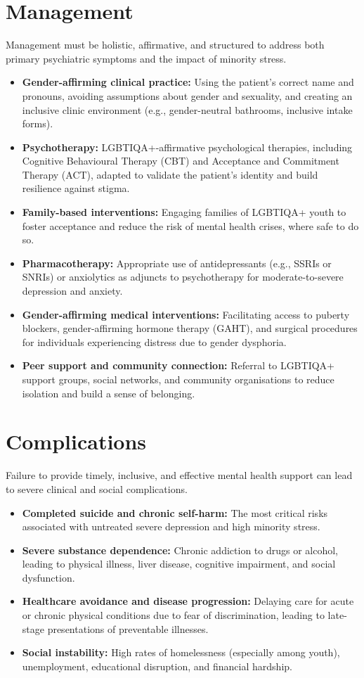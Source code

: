 \section*{Management}
Management must be holistic, affirmative, and structured to address both primary psychiatric symptoms and the impact of minority stress.
\begin{itemize}
    \item \textbf{Gender-affirming clinical practice:} Using the patient's correct name and pronouns, avoiding assumptions about gender and sexuality, and creating an inclusive clinic environment (e.g., gender-neutral bathrooms, inclusive intake forms).
    \item \textbf{Psychotherapy:} LGBTIQA+-affirmative psychological therapies, including Cognitive Behavioural Therapy (CBT) and Acceptance and Commitment Therapy (ACT), adapted to validate the patient's identity and build resilience against stigma.
    \item \textbf{Family-based interventions:} Engaging families of LGBTIQA+ youth to foster acceptance and reduce the risk of mental health crises, where safe to do so.
    \item \textbf{Pharmacotherapy:} Appropriate use of antidepressants (e.g., SSRIs or SNRIs) or anxiolytics as adjuncts to psychotherapy for moderate-to-severe depression and anxiety.
    \item \textbf{Gender-affirming medical interventions:} Facilitating access to puberty blockers, gender-affirming hormone therapy (GAHT), and surgical procedures for individuals experiencing distress due to gender dysphoria.
    \item \textbf{Peer support and community connection:} Referral to LGBTIQA+ support groups, social networks, and community organisations to reduce isolation and build a sense of belonging.
\end{itemize}

\section*{Complications}
Failure to provide timely, inclusive, and effective mental health support can lead to severe clinical and social complications.
\begin{itemize}
    \item \textbf{Completed suicide and chronic self-harm:} The most critical risks associated with untreated severe depression and high minority stress.
    \item \textbf{Severe substance dependence:} Chronic addiction to drugs or alcohol, leading to physical illness, liver disease, cognitive impairment, and social dysfunction.
    \item \textbf{Healthcare avoidance and disease progression:} Delaying care for acute or chronic physical conditions due to fear of discrimination, leading to late-stage presentations of preventable illnesses.
    \item \textbf{Social instability:} High rates of homelessness (especially among youth), unemployment, educational disruption, and financial hardship.
\end{itemize}

